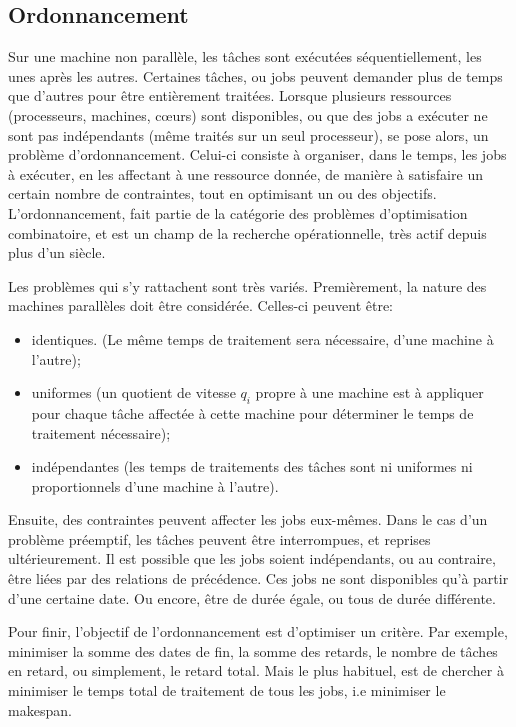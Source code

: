 \documentclass[a4paper,12pt]{report}
\theoremstyle{plain}				%
\theoremstyle{definition}				%
\begin{document}
\subsection{Ordonnancement}

Sur une machine non parallèle, les tâches sont exécutées
séquentiellement, les unes après les autres.
Certaines tâches, ou jobs peuvent demander plus de temps que d'autres
pour être entièrement traitées.
Lorsque plusieurs ressources (processeurs, machines, c\oe{}urs) sont
disponibles, ou que des jobs a exécuter ne sont pas indépendants (même
traités sur un seul processeur), se pose alors, un problème
d'ordonnancement.
Celui-ci consiste à organiser, dans le temps, les jobs à exécuter, en
les affectant à une ressource donnée, de manière à satisfaire un
certain nombre de contraintes, tout en optimisant un ou des objectifs.
L'ordonnancement, fait partie de la catégorie des problèmes
d'optimisation combinatoire, et est un champ de la recherche opérationnelle, très actif depuis plus d'un siècle.

Les problèmes qui s'y rattachent sont très variés.
Premièrement, la nature des machines parallèles doit être considérée.
Celles-ci peuvent être:
\begin{itemize}
\item identiques.
  (Le même temps de traitement sera nécessaire, d'une machine à
  l'autre);
\item uniformes (un quotient de vitesse $q_i$ propre à une machine est à
  appliquer pour chaque tâche affectée à cette machine pour déterminer
  le temps de traitement nécessaire);
\item indépendantes (les temps de traitements des tâches sont ni
  uniformes ni proportionnels d'une machine à l'autre).
\end{itemize}
Ensuite, des contraintes peuvent affecter les jobs eux-mêmes.
Dans le cas d'un problème préemptif, les tâches peuvent être
interrompues, et reprises ultérieurement.
Il est possible que les jobs soient indépendants, ou au contraire,
être liées par des relations de précédence.
Ces jobs ne sont disponibles qu'à partir d'une certaine date.
Ou encore, être de durée égale, ou tous de durée différente.

Pour finir, l'objectif de
l'ordonnancement est d'optimiser un
critère. Par exemple, minimiser la somme des dates de fin, la somme
des retards, le nombre de tâches en retard, ou simplement, le retard
total. Mais le plus habituel, est de chercher à minimiser le temps
total de traitement de tous les jobs, i.e minimiser le makespan.
\end{document}

